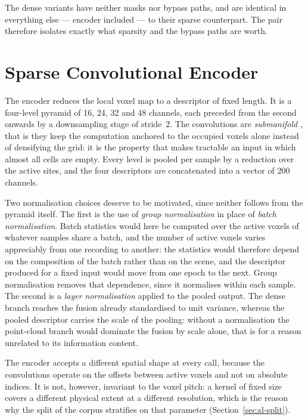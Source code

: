 The dense variants have neither masks nor bypass paths, and are identical in
everything else --- encoder included --- to their sparse counterpart. The pair
therefore isolates exactly what sparsity and the bypass paths are worth.

\section{Sparse Convolutional Encoder}
\label{sec:sparse-encoder}

The encoder reduces the local voxel map to a descriptor of fixed length. It is a
four-level pyramid of \num{16}, \num{24}, \num{32} and \num{48} channels, each
preceded from the second onwards by a downsampling stage of stride~\num{2}. The
convolutions are \emph{submanifold} \cite{graham2018submanifold}, that is they
keep the computation anchored to the occupied voxels alone instead of densifying
the grid: it is the property that makes tractable an input in which almost all
cells are empty. Every level
is pooled per sample by a reduction over the active sites, and the four
descriptors are concatenated into a vector of \num{200} channels.

Two normalisation choices deserve to be motivated, since neither follows from
the pyramid itself. The first is the use of \emph{group normalisation} in place
of \emph{batch normalisation}. Batch statistics would here be computed over the
active voxels of whatever samples share a batch, and the number of active voxels
varies appreciably from one recording to another: the statistics would therefore
depend on the composition of the batch rather than on the scene, and the
descriptor produced for a fixed input would move from one epoch to the next.
Group normalisation removes that dependence, since it normalises within each
sample. The second is a \emph{layer normalisation} applied to the pooled output.
The dense branch reaches the fusion already standardised to unit variance,
whereas the pooled descriptor carries the scale of the pooling: without a
normalisation the point-cloud branch would dominate the fusion by scale alone,
that is for a reason unrelated to its information content.

The encoder accepts a different spatial shape at every call, because the
convolutions operate on the offsets between active voxels and not on absolute
indices. It is not, however, invariant to the voxel pitch: a kernel of fixed
size covers a different physical extent at a different resolution, which is the
reason why the split of the corpus stratifies on that parameter
(Section~\ref{sec:sl-split}).


